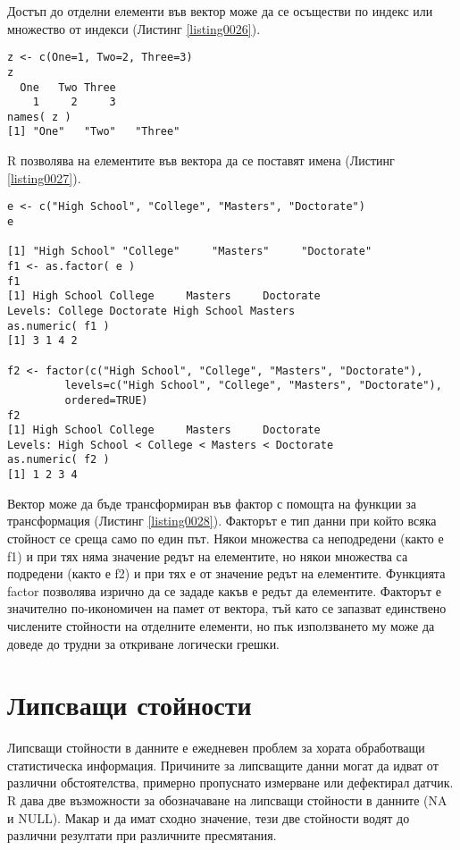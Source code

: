 Достъп до отделни елементи във вектор може да се осъществи по индекс или множество от индекси (Листинг \ref{listing0026}).

\begin{lstlisting}[caption=Имена на елементите във вектора, label=listing0027]
z <- c(One=1, Two=2, Three=3)
z
  One   Two Three 
    1     2     3 
names( z )
[1] "One"   "Two"   "Three"
\end{lstlisting}


R позволява на елементите във вектора да се поставят имена (Листинг \ref{listing0027}).

\begin{lstlisting}[caption=Трансформация на вектор във фактор, label=listing0028]
e <- c("High School", "College", "Masters", "Doctorate")
e

[1] "High School" "College"     "Masters"     "Doctorate"  
f1 <- as.factor( e )
f1
[1] High School College     Masters     Doctorate  
Levels: College Doctorate High School Masters
as.numeric( f1 )
[1] 3 1 4 2

f2 <- factor(c("High School", "College", "Masters", "Doctorate"), 
		 levels=c("High School", "College", "Masters", "Doctorate"),
		 ordered=TRUE)
f2
[1] High School College     Masters     Doctorate  
Levels: High School < College < Masters < Doctorate
as.numeric( f2 )
[1] 1 2 3 4
\end{lstlisting}

Вектор може да бъде трансформиран във фактор с помощта на функции за трансформация (Листинг \ref{listing0028}). Факторът е тип данни при който всяка стойност се среща само по един път. Някои множества са неподредени (както е f1) и при тях няма значение редът на елементите, но някои множества са подредени (както е f2) и при тях е от значение редът на елементите. Функцията factor позволява изрично да се зададе какъв е редът да елементите. Факторът е значително по-икономичен на памет от вектора, тъй като се запазват единствено числените стойности на отделните елементи, но пък използването му може да доведе до трудни за откриване логически грешки.

\section{Липсващи стойности}

Липсващи стойности в данните е ежедневен проблем за хората обработващи статистическа информация. Причините за липсващите данни могат да идват от различни обстоятелства, примерно пропуснато измерване или дефектирал датчик. R дава две възможности за обозначаване на липсващи стойности в данните (NA и NULL). Макар и да имат сходно значение, тези две стойности водят до различни резултати при различните пресмятания. 

